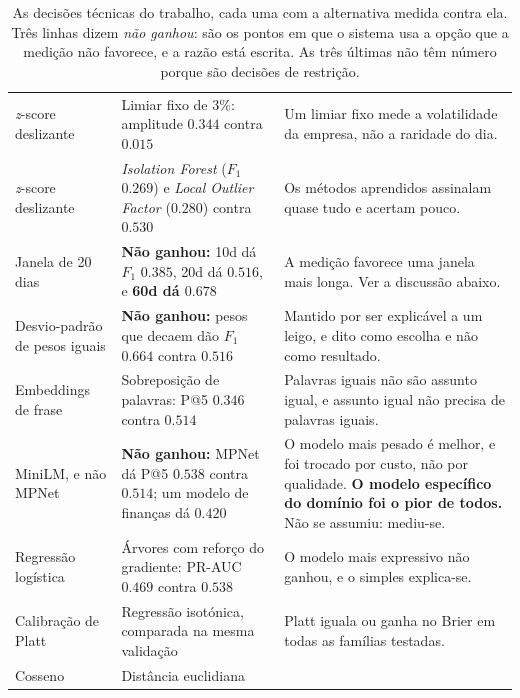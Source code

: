 \begin{table}[ht]
\caption[Cada escolha, contra a alternativa que perdeu]{As decisões técnicas do trabalho, cada uma
com a alternativa medida contra ela. Três linhas dizem \emph{não ganhou}: são os pontos em que o
sistema usa a opção que a medição não favorece, e a razão está escrita. As três últimas não têm
número porque são decisões de restrição.}
\label{tab:av_alternativas}
\centering
\scriptsize
\begin{tabular}{L{0.20\textwidth} L{0.30\textwidth} L{0.38\textwidth}}
\toprule
{} &  &  \\
\midrule
\emph{z}-score deslizante & Limiar fixo de $3\%$: amplitude $0.344$ contra $0.015$ &
Um limiar fixo mede a volatilidade da empresa, não a raridade do dia. \\
\addlinespace
\emph{z}-score deslizante & \emph{Isolation Forest} ($F_1$ $0.269$) e \emph{Local Outlier Factor}
($0.280$) contra $0.530$ & Os métodos aprendidos assinalam quase tudo e acertam pouco. \\
\addlinespace
Janela de 20 dias & \textbf{Não ganhou:} 10d dá $F_1$ $0.385$, 20d dá $0.516$, e \textbf{60d dá
$0.678$} & A medição favorece uma janela mais longa. Ver a discussão abaixo. \\
\addlinespace
Desvio-padrão de pesos iguais & \textbf{Não ganhou:} pesos que decaem dão $F_1$ $0.664$ contra
$0.516$ & Mantido por ser explicável a um leigo, e dito como escolha e não como resultado. \\
\addlinespace
Embeddings de frase & Sobreposição de palavras: P@5 $0.346$ contra $0.514$ &
Palavras iguais não são assunto igual, e assunto igual não precisa de palavras iguais. \\
\addlinespace
MiniLM, e não MPNet & \textbf{Não ganhou:} MPNet dá P@5 $0.538$ contra $0.514$; um modelo de finanças dá
$0.420$ & O modelo mais pesado é melhor, e foi trocado por custo, não por qualidade.
\textbf{O modelo específico do domínio foi o pior de todos.} Não se assumiu: mediu-se. \\
\addlinespace
Regressão logística & Árvores com reforço do gradiente: PR-AUC $0.469$ contra $0.538$ &
O modelo mais expressivo não ganhou, e o simples explica-se. \\
\addlinespace
Calibração de Platt & Regressão isotónica, comparada na mesma validação &
Platt iguala ou ganha no Brier em todas as famílias testadas. \\
\addlinespace
Cosseno & Distância euclidiana &

\end{tabular}
\end{table}

